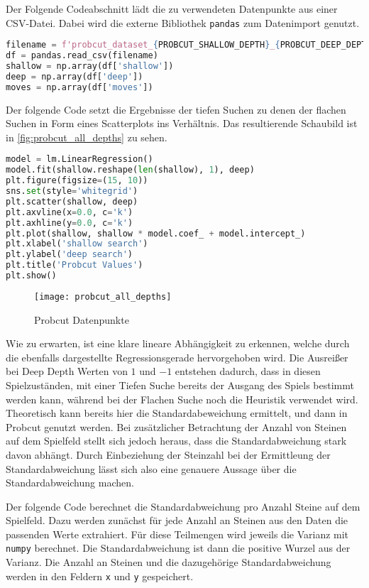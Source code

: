 Der Folgende Codeabschnitt lädt die zu verwendeten Datenpunkte aus einer
CSV-Datei. Dabei wird die externe Bibliothek
\passthrough{\lstinline!pandas!} zum Datenimport genutzt.

\begin{lstlisting}[language=Python]
filename = f'probcut_dataset_{PROBCUT_SHALLOW_DEPTH}_{PROBCUT_DEEP_DEPTH}.csv'
df = pandas.read_csv(filename)
shallow = np.array(df['shallow'])
deep = np.array(df['deep'])
moves = np.array(df['moves'])
\end{lstlisting}

Der folgende Code setzt die Ergebnisse der tiefen Suchen zu denen der
flachen Suchen in Form eines Scatterplots ins Verhältnis. Das
resultierende Schaubild ist in \autoref{fig:probcut_all_depths} zu
sehen.

\begin{lstlisting}[language=Python]
model = lm.LinearRegression()
model.fit(shallow.reshape(len(shallow), 1), deep)
plt.figure(figsize=(15, 10))
sns.set(style='whitegrid')
plt.scatter(shallow, deep)
plt.axvline(x=0.0, c='k')
plt.axhline(y=0.0, c='k')
plt.plot(shallow, shallow * model.coef_ + model.intercept_)
plt.xlabel('shallow search')
plt.ylabel('deep search')
plt.title('Probcut Values')
plt.show()
\end{lstlisting}

\begin{figure}[H]
    \centering
    \texttt{[image: probcut\_all\_depths]}
    \caption{Probcut Datenpunkte}
    \label{fig:probcut_all_depths}
\end{figure}

Wie zu erwarten, ist eine klare lineare Abhängigkeit zu erkennen, welche
durch die ebenfalls dargestellte Regressionsgerade hervorgehoben wird.
Die Ausreißer bei Deep Depth Werten von \(1\) und \(-1\) entstehen
dadurch, dass in diesen Spielzuständen, mit einer Tiefen Suche bereits
der Ausgang des Spiels bestimmt werden kann, während bei der Flachen
Suche noch die Heuristik verwendet wird. Theoretisch kann bereits hier
die Standardabeweichung ermittelt, und dann in Probcut genutzt werden.
Bei zusätzlicher Betrachtung der Anzahl von Steinen auf dem Spielfeld
stellt sich jedoch heraus, dass die Standardabweichung stark davon
abhängt. Durch Einbeziehung der Steinzahl bei der Ermittleung der
Standardabweichung lässt sich also eine genauere Aussage über die
Standardabweichung machen.

Der folgende Code berechnet die Standardabweichung pro Anzahl Steine auf
dem Spielfeld. Dazu werden zunächst für jede Anzahl an Steinen aus den
Daten die passenden Werte extrahiert. Für diese Teilmengen wird jeweils
die Varianz mit \passthrough{\lstinline!numpy!} berechnet. Die
Standardabweichung ist dann die positive Wurzel aus der Varianz. Die
Anzahl an Steinen und die dazugehörige Standardabweichung werden in den
Feldern \passthrough{\lstinline!x!} und \passthrough{\lstinline!y!}
gespeichert.

